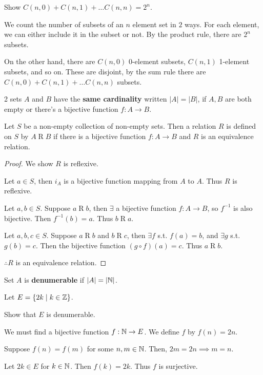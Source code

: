 \documentclass{article}
\begin{document}
    \begin{example}
      Show $C(n, 0) + C(n, 1) + \dots C(n, n) = 2^n$.

      We count the number of subsets of an $n$ element set in $2$ ways. For each element, we can either include it in the subset or not. By the product rule, there are $2^n$ subsets.

      On the other hand, there are  $C(n, 0)$ 0-element subsets, $C(n, 1)$ 1-element subsets, and so on. These are disjoint, by the sum rule there are $C(n, 0) + C(n, 1) + \dots C(n, n)$ subsets.
    \end{example}
    \begin{definition}
      2 sets $A$ and $B$ have the \textbf{same cardinality} written $|A| = |B|$, if $A, B$ are both empty or there's a bijective function $f : A \to B$.
    \end{definition}
    \begin{theorem}
      Let $S$ be a non-empty collection of non-empty sets. Then a relation $R$ is defined on $S$ by $A \mathrel{R} B$ if there is a bijective function $f: A \to B$ and $R$ is an equivalence relation.
    \end{theorem}
    \begin{proof}
      We show $R$ is reflexive.

      Let $a \in S$, then $i_A$ is a bijective function mapping from $A$ to $A$. Thus $R$ is reflexive.

      Let $a, b \in S$. Suppose $a \mathrel{R} b$, then $\exists$ a bijective function $f: A \to B$, so $f^{-1}$ is also bijective. Then $f^{-1}(b) = a$. Thus $b \mathrel{R} a$.

      Let $a, b, c \in S$. Suppose $a \mathrel{R} b$ and $b \mathrel{R} c$, then $\exists f$ s.t. $f(a) = b$, and $\exists g$ s.t. $g(b) = c$. Then the bijective function $(g \circ f)(a) = c$. Thus $a \mathrel{R} b$.

      $\therefore R$ is an equivalence relation.
    \end{proof}
    \begin{definition}
      Set $A$ is \textbf{denumerable} if $|A| = |\mathbb{N}|$.
    \end{definition}
    \begin{example}
      Let $E = \{2k \mid k \in \mathbb{Z}\}$.

      Show that $E$ is denumerable.

      We must find a bijective function $f: \mathbb{N} \to E$.
      We define $f$ by $f(n) = 2n$.

      Suppose $f(n) = f(m)$ for some $n, m \in \mathbb{N}$.
      Then, $2m = 2n \implies m = n$.

      Let $2k \in E$ for $k \in \mathbb{N}$. Then $f(k) = 2k$. Thus $f$ is surjective.
    \end{example}
\end{document}
